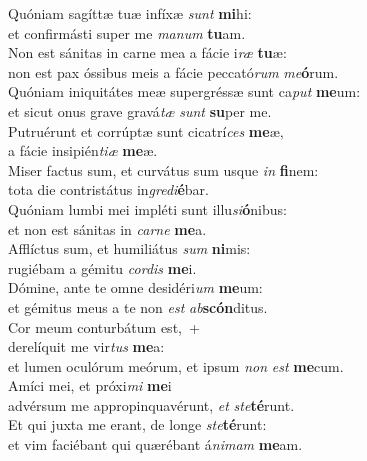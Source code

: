 \evenverse Quóniam sagíttæ tuæ infíxæ \textit{sunt} \textbf{mi}hi:~\*\\
\evenverse et confirmásti super me \textit{ma}\textit{num} \textbf{tu}am.\\
\oddverse Non est sánitas in carne mea a fácie i\textit{ræ} \textbf{tu}æ:~\*\\
\oddverse non est pax óssibus meis a fácie peccató\textit{rum} \textit{me}\textbf{ó}rum.\\
\evenverse Quóniam iniquitátes meæ supergréssæ sunt ca\textit{put} \textbf{me}um:~\*\\
\evenverse et sicut onus grave gravá\textit{tæ} \textit{sunt} \textbf{su}per me.\\
\oddverse Putruérunt et corrúptæ sunt cicatrí\textit{ces} \textbf{me}æ,~\*\\
\oddverse a fácie insipién\textit{ti}\textit{æ} \textbf{me}æ.\\
\evenverse Miser factus sum, et curvátus sum usque \textit{in} \textbf{fi}nem:~\*\\
\evenverse tota die contristátus in\textit{gre}\textit{di}\textbf{é}bar.\\
\oddverse Quóniam lumbi mei impléti sunt illu\textit{si}\textbf{ó}nibus:~\*\\
\oddverse et non est sánitas in \textit{car}\textit{ne} \textbf{me}a.\\
\evenverse Afflíctus sum, et humiliátus \textit{sum} \textbf{ni}mis:~\*\\
\evenverse rugiébam a gémitu \textit{cor}\textit{dis} \textbf{me}i.\\
\oddverse Dómine, ante te omne desidéri\textit{um} \textbf{me}um:~\*\\
\oddverse et gémitus meus a te non \textit{est} \textit{ab}\textbf{scón}ditus.\\
\evenverse Cor meum conturbátum est,~+\\
\evenverse  derelíquit me vir\textit{tus} \textbf{me}a:~\*\\
\evenverse et lumen oculórum meórum, et ipsum \textit{non} \textit{est} \textbf{me}cum.\\
\oddverse Amíci mei, et próxi\textit{mi} \textbf{me}i~\*\\
\oddverse advérsum me appropinquavérunt, \textit{et} \textit{ste}\textbf{té}runt.\\
\evenverse Et qui juxta me erant, de longe \textit{ste}\textbf{té}runt:~\*\\
\evenverse et vim faciébant qui quærébant á\textit{ni}\textit{mam} \textbf{me}am.\\
